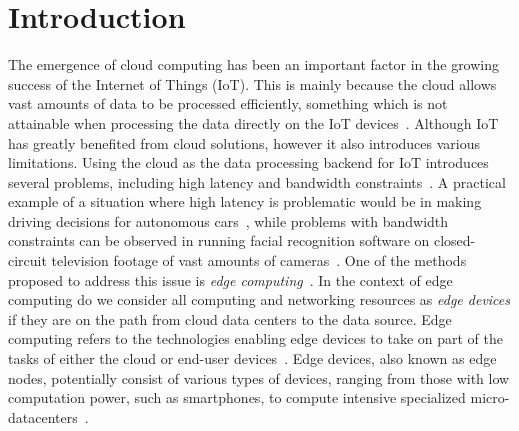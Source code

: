 \documentclass[article]{aaltoseries}
\begin{document}
\section{Introduction} 
The emergence of cloud computing has been an important factor in the growing success of the Internet of Things (IoT). %
This is mainly because the cloud allows vast amounts of data to be processed efficiently, something which is not attainable when processing the data directly on the IoT devices~\cite{shi_promise_2016}.
Although IoT has greatly benefited from cloud solutions, however it also introduces various limitations.
Using the cloud as the data processing backend for IoT introduces several problems, including high latency and bandwidth constraints~\cite{shi_edge_2016}.
A practical example of a situation where high latency is problematic would be in making driving decisions for autonomous cars~\cite{shi_promise_2016}, while problems with bandwidth constraints can be observed in running facial recognition software on closed-circuit television footage of vast amounts of cameras~\cite{taleb_multi-access_2017}.
One of the methods proposed to address this issue is \emph{edge computing}~\cite{shi_edge_2016}.
In the context of edge computing do we consider all computing and networking resources as \emph{edge devices} if they are on the path from cloud data centers to the data source.
Edge computing refers to the technologies enabling edge devices to take on part of the tasks of either the cloud or end-user devices~\cite{shi_edge_2016}.
Edge devices, also known as edge nodes, potentially consist of various types of devices, ranging from those with low computation power, such as smartphones, to compute intensive specialized micro-datacenters~\cite{shi_promise_2016}.

\end{document}

